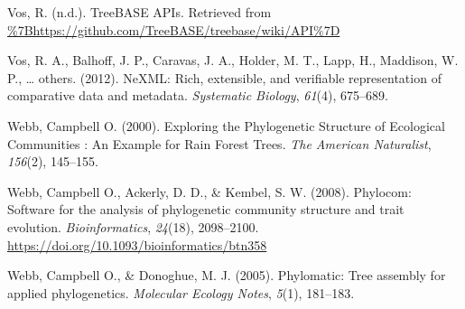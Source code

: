 \documentclass[
  english,
  man]{apa6}
\newlength{\cslhangindent}
\newlength{\cslentryspacingunit} %
\newenvironment{CSLReferences}[2] %
 {%
  \setlength{\parindent}{0pt}
  \ifodd #1
  \let\oldpar\par
  \def\par{\hangindent=\cslhangindent\oldpar}
  \fi
  \setlength{\parskip}{#2\cslentryspacingunit}
 }%
 {}
\begin{document}
\begin{CSLReferences}{1}{0}
\leavevmode{}%
Vos, R. (n.d.). {TreeBASE APIs}. Retrieved from \url{\%7Bhttps://github.com/TreeBASE/treebase/wiki/API\%7D}

\leavevmode{}%
Vos, R. A., Balhoff, J. P., Caravas, J. A., Holder, M. T., Lapp, H., Maddison, W. P., \ldots{} others. (2012). NeXML: Rich, extensible, and verifiable representation of comparative data and metadata. \emph{Systematic Biology}, \emph{61}(4), 675--689.

\leavevmode{}%
Webb, Campbell O. (2000). {Exploring the Phylogenetic Structure of Ecological Communities : An Example for Rain Forest Trees}. \emph{The American Naturalist}, \emph{156}(2), 145--155.

\leavevmode{}%
Webb, Campbell O., Ackerly, D. D., \& Kembel, S. W. (2008). {Phylocom: Software for the analysis of phylogenetic community structure and trait evolution}. \emph{Bioinformatics}, \emph{24}(18), 2098--2100. \url{https://doi.org/10.1093/bioinformatics/btn358}

\leavevmode{}%
Webb, Campbell O., \& Donoghue, M. J. (2005). Phylomatic: Tree assembly for applied phylogenetics. \emph{Molecular Ecology Notes}, \emph{5}(1), 181--183.

\end{CSLReferences}

\endgroup


\end{document}
